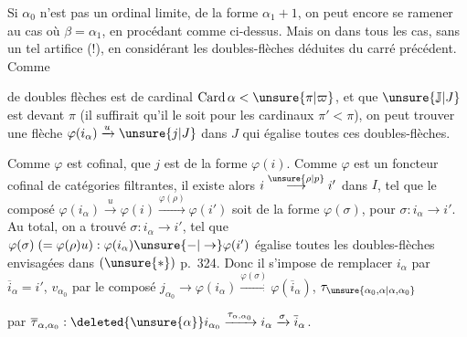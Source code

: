  Si $\alpha_0$ n'est pas un ordinal limite,  de la forme $\alpha_1+1$, on peut encore se ramener au cas où $\beta=\alpha_1$, en procédant comme ci-dessus. Mais on   dans tous les cas,  sans un tel artifice (!), en considérant les doubles-flèches
déduites du carré précédent. Comme 

 de  doubles flèches est de cardinal $\operatorname{Card}\alpha<\unsure{\pi|\varpi}$, et que $\unsure{\mathbb{J}|J}$ est  devant $\pi$ (il suffirait qu'il le soit pour les cardinaux $\pi'<\pi$), on peut trouver une flèche $\varphi(i_\alpha)\xrightarrow{u}\unsure{j|J}$ dans $J$ qui égalise toutes ces doubles-flèches.

Comme $\varphi$ est cofinal,  que $j$ est de la forme $\varphi(i)$. Comme $\varphi$ est un foncteur cofinal de catégories filtrantes, il existe alors $i\overset{\unsure{\rho|p}}{\longrightarrow}i'$ dans $I$, tel que \deleted{$\unsure{\varphi(\rho)}$} le composé $\varphi(i_\alpha)\xrightarrow{u}\varphi(i)\xrightarrow{\varphi(\rho)}\varphi(i')$ soit de la forme $\varphi(\sigma)$, pour $\sigma:i_\alpha\longrightarrow i'$.
Au total, on a trouvé $\sigma:i_\alpha\longrightarrow i'$, tel que $\varphi(\sigma)\;(=\varphi(\rho)u):\varphi(i_\alpha)\unsure{-|\to}\varphi(i')$ égalise toutes les doubles-flèches envisagées dans $(\unsure{*})$ p.~324. Donc il s'impose de remplacer $i_\alpha$ par $\overline{i}_\alpha=i'$, $v_{\alpha_0}$ par le composé $j_{\alpha_0}\to\varphi(i_\alpha)\xrightarrow{\varphi(\sigma)}\varphi(\overline{i}_\alpha)$, $\tau_{\unsure{\alpha_0,\alpha|\alpha,\alpha_0}}$

par  $\overline{\tau}_{\alpha,\alpha_0}:\deleted{\unsure{\alpha}}i_{\alpha_0}\xrightarrow{\tau_{\alpha,\alpha_0}}i_\alpha\xrightarrow{\sigma}\overline{i}_\alpha$.


